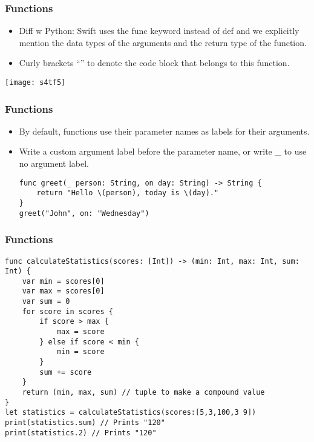 \begin{frame}[fragile] \frametitle{Functions}

\begin{itemize}
\item Diff w Python: Swift uses the func keyword instead of def and we explicitly mention the data types of the arguments and the return type of the function.
\item Curly brackets “{}” to denote the code block that belongs to this function.
\end{itemize}


\begin{center}
\texttt{[image: s4tf5]}
\end{center}

\end{frame}

\begin{frame}[fragile] \frametitle{Functions}

\begin{itemize}
\item By default, functions use their parameter names as labels for their arguments. 
\item Write a custom argument label before the parameter name, or write \_ to use no argument label.

\begin{lstlisting}[basicstyle=\scriptsize]
func greet(_ person: String, on day: String) -> String {
    return "Hello \(person), today is \(day)."
}
greet("John", on: "Wednesday")
\end{lstlisting}

\end{itemize}
\end{frame}

\begin{frame}[fragile] \frametitle{Functions}

\begin{lstlisting}[basicstyle=\scriptsize]
func calculateStatistics(scores: [Int]) -> (min: Int, max: Int, sum: Int) {
    var min = scores[0]
    var max = scores[0]
    var sum = 0
    for score in scores {
        if score > max {
            max = score
        } else if score < min {
            min = score
        }
        sum += score
    }
    return (min, max, sum) // tuple to make a compound value
}
let statistics = calculateStatistics(scores:[5,3,100,3 9])
print(statistics.sum) // Prints "120"
print(statistics.2) // Prints "120"
\end{lstlisting}
\end{frame}

